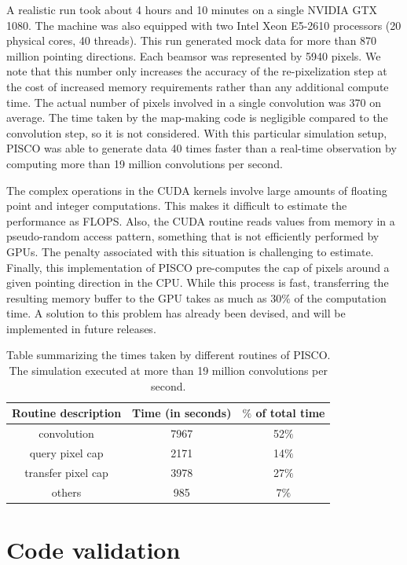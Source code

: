 \documentclass[a4paper,11pt]{article}
\begin{document}
A realistic run took about 4 hours and 10 minutes on a single NVIDIA GTX 1080. The machine was also equipped with two Intel Xeon E5-2610 processors (20 physical cores, 40 threads). This run generated mock data for more than 870 million pointing directions. Each beamsor was represented by 5940 pixels. We note that this number only increases the accuracy of the re-pixelization step at the cost of increased memory requirements rather than any additional compute time. The actual number of pixels involved in a single convolution was 370 on average. The time taken by the map-making code is negligible compared to the convolution step, so it is not considered. With this particular simulation setup, PISCO was able to generate data 40 times faster than a real-time observation by computing more than 19 million convolutions per second. 

The complex operations in the CUDA kernels involve large amounts of floating point and integer computations. This makes it difficult to estimate the performance as FLOPS. Also, the CUDA routine reads values from memory in a pseudo-random access pattern, something that is not efficiently performed by GPUs. The penalty associated with this situation is challenging to estimate. Finally, this implementation of PISCO pre-computes the cap of pixels around a given pointing direction in the CPU. While this process is fast, transferring the resulting memory buffer to the GPU takes as much as $30\%$ of the computation time. A solution to this problem has already been devised, and will be implemented in future releases.

\begin{table}[tbp]
	\centering
	\begin{tabular}{|c|c|c|}
		\hline
		Routine description & Time (in seconds) & $\%$ of total time \\
		\hline
		convolution & 7967 & 52$\%$  \\
		query pixel cap & 2171 & 14$\%$ \\
		transfer pixel cap & 3978 & 27$\%$ \\
		others & 985 & 7$\%$ \\ 
		\hline
	\end{tabular}
	\caption{Table summarizing the times taken by different routines of PISCO. The simulation executed at more than 19 million convolutions per second.}\label{tbl1}
\end{table}

%
\section{Code validation}
\label{sec::validation}
\end{document}
